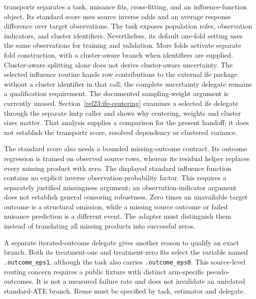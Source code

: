 transportr separates a task, nuisance fits, cross-fitting, and an influence-function object. Its standard score uses source inverse odds and an average response difference over target observations. The task exposes population roles, observation indicators, and cluster identifiers. Nevertheless, its default one-fold setting uses the same observations for training and validation. More folds activate separate fold construction, with a cluster-aware branch when identifiers are supplied. Cluster-aware splitting alone does not derive cluster-aware uncertainty. The selected influence routine hands row contributions to the external ife package without a cluster identifier in that call; the complete uncertainty delegate remains a qualification requirement. The documented sampling-weight argument is currently unused. Section~\ref{rel23:ife-centering} examines a selected ife delegate through the separate lmtp caller and shows why centering, weights and cluster sizes matter. That analysis supplies a comparison for the present handoff; it does not establish the transportr score, resolved dependency or clustered variance.~\citep{exec25_rtm_transportr}

The standard score also needs a bounded missing-outcome contract. Its outcome regression is trained on observed source rows, whereas its residual helper replaces every missing product with zero. The displayed standard influence function contains no explicit inverse observation-probability factor. This requires a separately justified missingness argument; an observation-indicator argument does not establish general censoring robustness. Zero times an unavailable target outcome is a structural omission, while a missing source outcome or failed nuisance prediction is a different event. The adapter must distinguish them instead of translating all missing products into successful zeros.~\citep{exec25_rtm_transportr}

A separate iterated-outcome delegate gives another reason to qualify an exact branch. Both its treatment-one and treatment-zero fits select the variable named \texttt{.outcome\_eps1}, although the task also carries \texttt{.outcome\_eps0}. This source-level routing concern requires a public fixture with distinct arm-specific pseudo-outcomes. It is not a measured failure rate and does not invalidate an unrelated standard-ATE branch. Reuse must be specified by task, estimator and delegate.~\citep{exec25_rtm_transportr}

